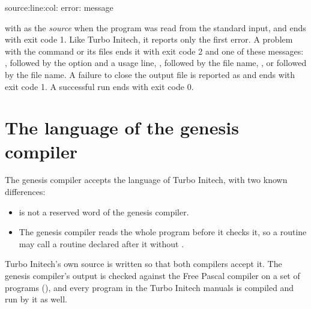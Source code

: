 \begin{TypeIn}
source:line:col: error: message
\end{TypeIn}

with  as the \textit{source} when the program was read from
the standard input, and  ends with exit code 1.  Like Turbo
Initech, it reports only the first error.  A problem with the command or
its files ends it with exit code 2 and one of these messages:
,  followed by the option
and a usage line, , 
followed by the file name, , or 
followed by the file name.  A failure to close the output file is reported
as  and ends with exit code 1.  A successful run ends
with exit code 0.

\section{The language of the genesis compiler}
The genesis compiler accepts the language of Turbo Initech, with two
known differences:

\begin{itemize}
\item {} is not a reserved word of the genesis compiler.
\item The genesis compiler reads the whole program before it checks it, so
  a routine may call a routine declared after it without .
\end{itemize}

Turbo Initech's own source is written so that both compilers accept it.
The genesis compiler's output is checked against the Free Pascal compiler
on a set of programs (), and every program in
the Turbo Initech manuals is compiled and run by it as well.
